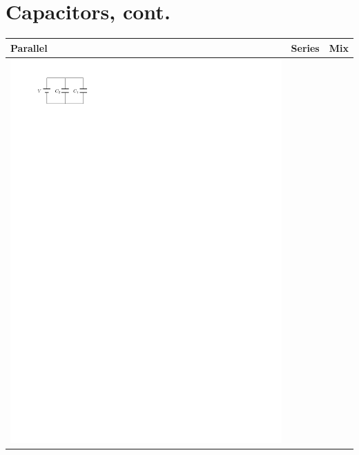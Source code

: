 \documentclass{article}
\begin{document}
  \section{Capacitors, cont.}
    \begin{tabularx}{\textwidth}{X | X | X}
      \textbf{Parallel} & \textbf{Series} & \textbf{Mix}\\
      \hline
      \includegraphics{figures/capacitors-in-parallel.pdf}\newline
      

\end{tabularx}
\end{document}
